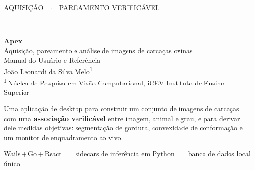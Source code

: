 \documentclass[11pt,a4paper,oneside]{book}
\begin{document}
\frontmatter

\begin{titlepage}
\thispagestyle{empty}
\vspace*{2.2cm}
\begin{flushleft}
{\ttfamily\color{cyandk}\large AQUISIÇÃO\ \ $\cdot$\ \ PAREAMENTO VERIFICÁVEL}\\[6pt]
{\color{cyan}\rule{\linewidth}{1.2pt}}\\[10pt]
{\sffamily\bfseries\fontsize{52}{56}\selectfont\color{ink}Apex}\\[10pt]
{\sffamily\Large\color{muted}Aquisição, pareamento e análise de imagens de carcaças ovinas}\\[4pt]
{\sffamily\large\color{muted}Manual do Usuário e Referência}\\[22pt]
{\sffamily\large\color{ink}João Leonardi da Silva Melo\textsuperscript{1}}\\[3pt]
{\sffamily\small\color{muted}\textsuperscript{1}\,Núcleo de Pesquisa em Visão Computacional, iCEV Instituto de Ensino Superior}
\end{flushleft}

\vfill

\begin{tcolorbox}[colback=codebg,colframe=hair,boxrule=0.6pt,arc=2pt]
\small\sffamily
Uma aplicação de desktop para construir um conjunto de imagens de carcaças com
uma \textbf{associação verificável} entre imagem, animal e grau, e para derivar
dele medidas objetivas: segmentação de gordura, convexidade de conformação e um
monitor de enquadramento ao vivo.
\end{tcolorbox}

\vspace{0.6cm}
{\ttfamily\small\color{muted}
Wails\,+\,Go\,+\,React\ \ \textbullet\ \ sidecars de inferência em Python\ \ \textbullet\ \ banco de dados local único\par}
\end{titlepage}

\tableofcontents

\mainmatter















\end{document}
